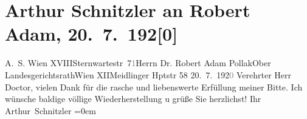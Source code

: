 

         
         \renewcommand{\erwaehntePersonen}{Personen: Robert Adam}
         \renewcommand{\erwaehnteOrte}{Orte: Erholungsheim der Bundesbeamten, Gutenstein, Meidlinger Hauptstraße, Niederösterreich, Sternwartestraße 71, Wien, XII., Meidling, XVIII., Währing}
         \renewcommand{\erwaehnteWerke}{}
               \section[Arthur Schnitzler an Robert Adam, 20. 7. 192{[}0{]}]{ Arthur Schnitzler an Robert Adam, 20. 7. 192{[}0{]}}\nopagebreak{}\rehead{ }\begin{ledgroupsized}[t]{13cm}\normalsize\beginnumbering{} \toendnotes[C]{\smallbreak\pagebreak[2]} 
\pstart{}{\pb}A. S. Wien XVIII\pend{}\pstart{}Sternwartestr 7\textcolor{gray}{1}\pend{}{\bigskip}\pstart{}Herrn Dr. Robert Adam Pollak\pend{}\pstart{}Ober Landesgerichtsrath\pend{}\pstart{}Wien XII\pend{}\pstart{}Meidlinger Hptstr 58\pend{}{\bigskip}\pstart
           \raggedleft{}{\pb}20. 7. 192\textcolor{gray}{0}\pend
           \pstart{}Verehrter Herr Doctor,\pend\pstart
           vielen Dank für die rasche und liebenswerte Erfüllung meiner Bitte.\pend
           \pstart
           Ich wünsche baldige völlige Wiederherstellung u grüße Sie herzlichst!\pend
           \pstart
           Ihr{\\[\baselineskip]}\spacefill\mbox{Arthur Schnitzler}\pend
           \leftskip=0em{}
         
         \endnumbering{}\end{ledgroupsized}  \newcommand{\dateiname}{L02351}\newcommand{\titel}{Arthur Schnitzler an Robert Adam, 20. 7. 192[0]}\newcommand{\editorInnen}{Martin Anton Müller und Gerd-Hermann Susen}
      